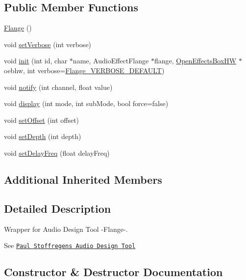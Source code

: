 \subsection*{Public Member Functions}
\begin{DoxyCompactItemize}
\item 
\mbox{\hyperlink{class_flange_ab4ec2beb299cf097f76d090545f6e34f}{Flange}} ()
\item 
void \mbox{\hyperlink{class_flange_ac44903a68dbb8a6de019b3f1e7205461}{set\+Verbose}} (int verbose)
\item 
void \mbox{\hyperlink{class_flange_a0b08351febfa39989acb6446c096346e}{init}} (int id, char $\ast$name, Audio\+Effect\+Flange $\ast$flange, \mbox{\hyperlink{class_open_effects_box_h_w}{Open\+Effects\+Box\+HW}} $\ast$oebhw, int verbose=\mbox{\hyperlink{_flange_8h_abe629c5baa4633f9806318a67d486437}{Flange\+\_\+\+V\+E\+R\+B\+O\+S\+E\+\_\+\+D\+E\+F\+A\+U\+LT}})
\item 
void \mbox{\hyperlink{class_flange_a10541758c108d92a73e96ed9f8f1377b}{notify}} (int channel, float value)
\item 
void \mbox{\hyperlink{class_flange_afce68b7e8538cf7bfacdcec8d603f602}{display}} (int mode, int sub\+Mode, bool force=false)
\item 
void \mbox{\hyperlink{class_flange_a733bc8118f327fc4c31c896642ad49ad}{set\+Offset}} (int offset)
\item 
void \mbox{\hyperlink{class_flange_a34ba641893065a297d5fe767a1fa2fc4}{set\+Depth}} (int depth)
\item 
void \mbox{\hyperlink{class_flange_af132f265ce1567691ffa2ce29bb512c6}{set\+Delay\+Freq}} (float delay\+Freq)
\end{DoxyCompactItemize}
\subsection*{Additional Inherited Members}


\subsection{Detailed Description}
Wrapper for Audio Design Tool -\/\+Flange-\/. 

See \href{https://www.pjrc.com/teensy/gui/}{\tt Paul Stoffregen\textquotesingle{}s Audio Design Tool} 

\subsection{Constructor \& Destructor Documentation}
\mbox{\label{class_flange_ab4ec2beb299cf097f76d090545f6e34f}} 
